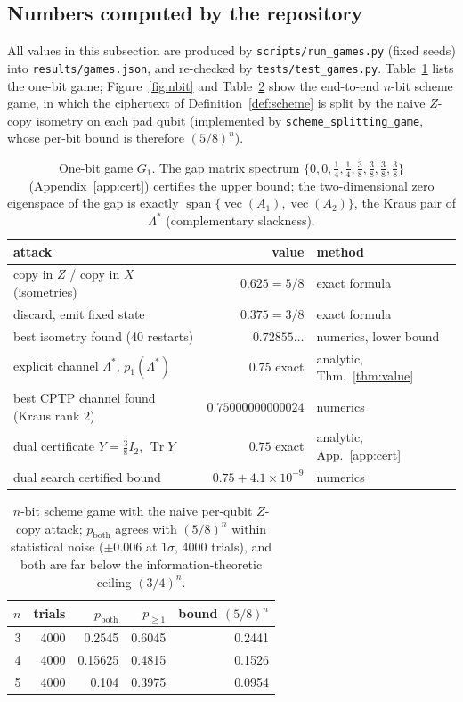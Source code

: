\documentclass[11pt]{article}
\theoremstyle{definition}
\newcommand{\tr}{\operatorname{Tr}}
\begin{document}
\subsection{Numbers computed by the repository}

All values in this subsection are produced by \texttt{scripts/run\_games.py}
(fixed seeds) into \texttt{results/games.json}, and re-checked by
\texttt{tests/test\_games.py}.  Table~\ref{tab:onebit} lists the one-bit game;
Figure~\ref{fig:nbit} and Table~\ref{tab:nbit} show the end-to-end $n$-bit
scheme game, in which the ciphertext of Definition~\ref{def:scheme} is split by
the naive $Z$-copy isometry on each pad qubit (implemented by
\texttt{scheme\_splitting\_game}, whose per-bit bound is therefore $(5/8)^n$).

\begin{table}[h]
\centering
\begin{tabular}{lrl}
\hline
attack & value & method \\
\hline
copy in $Z$ / copy in $X$ (isometries) & $0.625 = 5/8$ & exact formula \\
discard, emit fixed state & $0.375 = 3/8$ & exact formula \\
best isometry found (40 restarts) & $0.72855\ldots$ & numerics, lower bound \\
explicit channel $\Lambda^\ast$, $p_1(\Lambda^\ast)$ & $0.75$ exact & analytic, Thm.~\ref{thm:value} \\
best CPTP channel found (Kraus rank 2) & $0.75000000000024$ & numerics \\
dual certificate $Y = \tfrac38 I_2$, $\tr Y$ & $0.75$ exact & analytic, App.~\ref{app:cert} \\
dual search certified bound & $0.75 + 4.1\times 10^{-9}$ & numerics \\
\hline
\end{tabular}
\caption{One-bit game $G_1$.  The gap matrix spectrum $\{0,0,\tfrac14,\tfrac14,
\tfrac38,\tfrac38,\tfrac38,\tfrac38\}$ (Appendix~\ref{app:cert}) certifies the
upper bound; the two-dimensional zero eigenspace of the gap is exactly
$\operatorname{span}\{\operatorname{vec}(A_1), \operatorname{vec}(A_2)\}$, the
Kraus pair of $\Lambda^\ast$ (complementary slackness).}
\label{tab:onebit}
\end{table}

\begin{table}[h]
\centering
\begin{tabular}{rrrrr}
\hline
$n$ & trials & $p_{\text{both}}$ & $p_{\ge 1}$ & bound $(5/8)^n$ \\
\hline
3 & 4000 & 0.2545 & 0.6045 & 0.2441 \\
4 & 4000 & 0.15625 & 0.4815 & 0.1526 \\
5 & 4000 & 0.104 & 0.3975 & 0.0954 \\
\hline
\end{tabular}
\caption{$n$-bit scheme game with the naive per-qubit $Z$-copy attack;
$p_{\text{both}}$ agrees with $(5/8)^n$ within statistical noise ($\pm 0.006$
at $1\sigma$, 4000 trials), and both are far below the information-theoretic
ceiling $(3/4)^n$.}
\label{tab:nbit}
\end{table}
\end{document}
